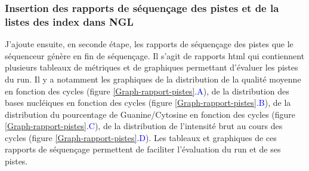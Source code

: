 \subsubsection*{Insertion des rapports de séquençage des pistes et de la listes des index dans NGL}
J'ajoute ensuite, en seconde étape, les rapports de séquençage des pistes que le séquenceur génère en fin de séquençage.
Il s'agit de rapports html qui contiennent plusieurs tableaux de métriques et de graphiques permettant d'évaluer les pistes du run.
Il y a notamment les graphiques de la distribution de la qualité moyenne en fonction des cycles (figure \ref{Graph-rapport-pistes}\textcolor{blue}{.A}), de la distribution des bases nucléiques en fonction des cycles (figure \ref{Graph-rapport-pistes}\textcolor{blue}{.B}), de la distribution du pourcentage de Guanine/Cytosine en fonction des cycles (figure \ref{Graph-rapport-pistes}\textcolor{blue}{.C}), de la distribution de l'intensité brut au cours des cycles (figure \ref{Graph-rapport-pistes}\textcolor{blue}{.D}).
Les tableaux et graphiques de ces rapports de séquençage permettent de faciliter l'évaluation du run et de ses pistes.\\

